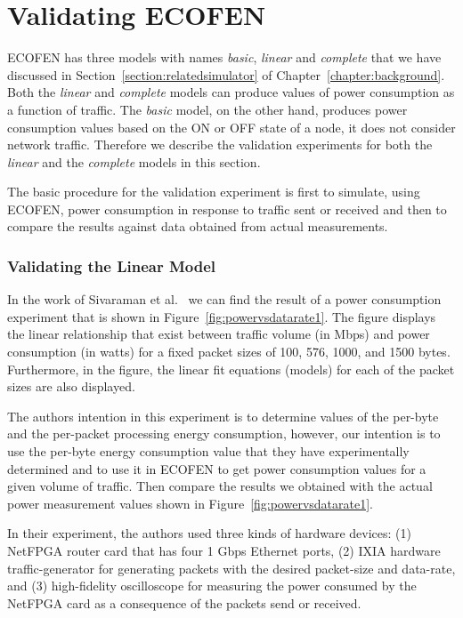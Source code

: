 \section{Validating ECOFEN}
ECOFEN has three models with names \emph{basic}, \emph{linear} and \emph{complete} that we have discussed in Section~\ref{section:relatedsimulator} of Chapter~\ref{chapter:background}. Both the \emph{linear} and \emph{complete} models can produce values of power consumption as a function of traffic. The  \emph{basic} model, on the other hand, produces power consumption values based on the ON or OFF state of a node, it does not consider network traffic. Therefore we describe the validation experiments for both the \emph{linear} and the \emph{complete} models in this section. 
 
The basic procedure for the validation experiment is first to simulate, using ECOFEN, power consumption in response to traffic sent or received and then to compare the results against data obtained from actual measurements.


\subsubsection{Validating the Linear Model}
In the work of Sivaraman et al.{\ }\cite{Sivaraman} we can find the result of a power consumption experiment that is shown in Figure~\ref{fig:powervsdatarate1}. The figure displays the linear relationship that exist between traffic volume (in Mbps) and power consumption (in watts) for a fixed packet sizes of 100, 576, 1000, and 1500 bytes. Furthermore, in the figure, the linear fit equations (models) for each of the packet sizes are also displayed. 

The authors intention in this experiment is to determine values of the per-byte and the per-packet processing energy consumption, however, our intention is to use the per-byte energy consumption value that they have experimentally determined and to use it in ECOFEN to get power consumption values for a given volume of traffic. Then compare the results we obtained with the actual power measurement values shown in Figure~\ref{fig:powervsdatarate1}.

In their experiment, the authors used three kinds of hardware devices: (1) NetFPGA router card that has four 1 Gbps Ethernet ports, (2) IXIA hardware traffic-generator for generating packets with the desired packet-size and data-rate, and (3) high-fidelity oscilloscope for measuring the power consumed by the NetFPGA card as a consequence of the packets send or received. 

